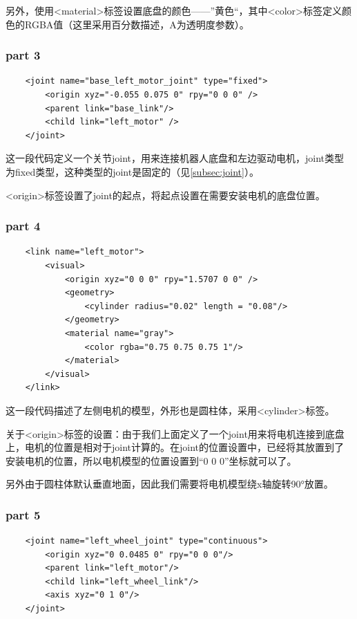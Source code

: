 \documentclass[10pt, oneside]{book}
\begin{document}
另外，使用<material>标签设置底盘的颜色——”黄色“，其中<color>标签定义颜色的RGBA值（这里采用百分数描述，A为透明度参数）。

\subsubsection{part 3}

\begin{verbatim}
    <joint name="base_left_motor_joint" type="fixed">
        <origin xyz="-0.055 0.075 0" rpy="0 0 0" />        
        <parent link="base_link"/>
        <child link="left_motor" />
    </joint>
\end{verbatim}

这一段代码定义一个关节joint，用来连接机器人底盘和左边驱动电机，joint类型为fixed类型，这种类型的joint是固定的（见\autoref{subsec:joint}）。

<origin>标签设置了joint的起点，将起点设置在需要安装电机的底盘位置。

\subsubsection{part 4}

\begin{verbatim}
    <link name="left_motor">
        <visual>
            <origin xyz="0 0 0" rpy="1.5707 0 0" />
            <geometry>
                <cylinder radius="0.02" length = "0.08"/>
            </geometry>
            <material name="gray">
                <color rgba="0.75 0.75 0.75 1"/>
            </material>
        </visual>
    </link>
\end{verbatim}

这一段代码描述了左侧电机的模型，外形也是圆柱体，采用<cylinder>标签。

关于<origin>标签的设置：由于我们上面定义了一个joint用来将电机连接到底盘上，电机的位置是相对于joint计算的。在joint的位置设置中，已经将其放置到了安装电机的位置，所以电机模型的位置设置到“0 0 0”坐标就可以了。

另外由于圆柱体默认垂直地面，因此我们需要将电机模型绕x轴旋转90°放置。

\subsubsection{part 5}

\begin{verbatim}
    <joint name="left_wheel_joint" type="continuous">
        <origin xyz="0 0.0485 0" rpy="0 0 0"/>
        <parent link="left_motor"/>
        <child link="left_wheel_link"/>
        <axis xyz="0 1 0"/>
    </joint>
\end{verbatim}
\end{document}
